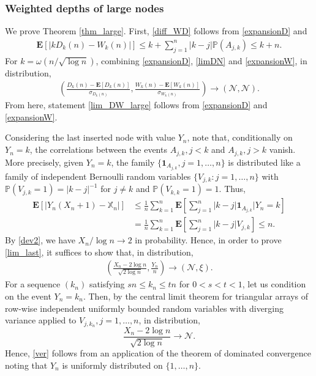 \documentclass{amsart}       %
\newcommand{\sN}{\mathcal N}
\newcommand{\E}[1]{\ensuremath{\mathbf{E} \left[#1 \right]}}
\newcommand{\Prob}[1]{\ensuremath{\mathbb{P} \left(#1 \right)}}
\newcommand{\I}[1]{\ensuremath{\mathbf{1}_{  #1  }}}
\begin{document}
\subsubsection{Weighted depths of large nodes}
We prove Theorem \ref{thm_large}. First, \eqref{diff_WD} follows  from \eqref{expansionD} and
\begin{align} \label{bounddk}  \E{\left | k D_k(n) - W_k(n) \right|} \leq k + \sum_{j=1}^n |k-j| \Prob{A_{j,k}} \leq k+n. \end{align}
For $k = \omega(n/\sqrt{\log n})$, combining \eqref{expansionD}, \eqref{limDN} and \eqref{expansionW}, in distribution, 
\begin{align*} \left( \frac{D_k(n) - \E{D_k(n)}}{\sigma_{ D_k(n)}}, \frac{W_k(n) - \E{W_k(n)}}{\sigma_{W_k(n)}} \right) \to (\sN, \sN). \end{align*}
From here, statement \eqref{lim_DW_large} follows from \eqref{expansionD} and \eqref{expansionW}.

Considering the last inserted node with value $Y_n$, note that, conditionally on $Y_n = k$, the correlations between the events $A_{j,k}, j < k$ and $A_{j,k}, j > k$ vanish. More precisely, given $Y_n = k$, the family $\{ \I{A_{j,k}}, j = 1, \ldots, n\}$ is distributed like a family of independent Bernoulli random variables $\{V_{j,k}: j = 1, \ldots, n\}$ with $\Prob{V_{j,k}=1} = |k-j|^{-1}$ for $j \neq k$ and $\Prob{V_{k,k}=1} = 1$. Thus,
\begin{align*}
\E{|Y_n (X_n+1) - \mathbb X_n|} & \leq \frac 1 n \sum_{k=1}^n \E{\sum_{j=1}^n |k-j| \I{A_{j,k}} \Bigg| Y_n = k} \\ 
& = \frac 1 n \sum_{k=1}^n\E{\sum_{j=1}^n |k-j| V_{j,k}} \leq n.
\end{align*}
By \eqref{dev2}, we have $X_n / \log n \to 2$ in probability. Hence, in order to prove \eqref{lim_last}, it suffices to show that, in distribution,
\begin{align} \label{ver} \left(\frac{X_n - 2 \log n}{\sqrt{2 \log n}}, \frac{Y_n}{n} \right) \to \left(\sN, \xi \right). \end{align}
For a sequence $(k_n)$ satisfying $sn \leq k_n \leq tn$ for $0 < s < t < 1$, let us condition on the event $Y_n = k_n$. Then, by the central limit theorem for triangular arrays of row-wise independent uniformly bounded random variables with diverging variance applied to $V_{j, k_n}, j =1, \ldots, n$, in distribution, 
$$\frac{X_n - 2 \log n}{\sqrt{2 \log n}} \to \sN.$$
Hence, \eqref{ver} follows from an application of the theorem of dominated convergence noting that $Y_n$ is uniformly distributed on $\{1, \ldots, n\}$.
\end{document}
